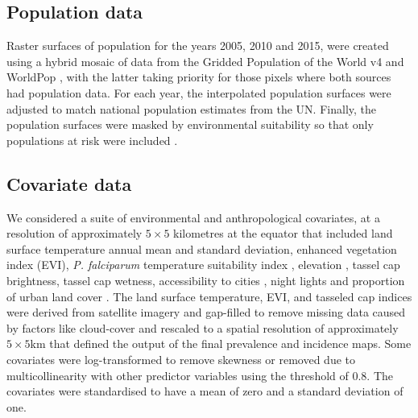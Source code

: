\documentclass{statsoc}
\begin{document}
\subsection*{Population data}

Raster surfaces of population for the years 2005, 2010 and 2015, were created using a hybrid mosaic of data from the Gridded Population of the World v4 \citep{gpw4} and WorldPop \citep{tatem2017worldpop}, with the latter taking priority for those pixels where both sources had population data.
For each year, the interpolated population surfaces were adjusted to match national population estimates from the UN. 
Finally, the population surfaces were masked by environmental suitability so that only populations at risk were included \citep{weiss2019mapping}.


\subsection*{Covariate data}

We considered a suite of environmental and anthropological covariates, at a resolution of approximately $5 \times 5$ kilometres at the equator that included land surface temperature annual mean and standard deviation, enhanced vegetation index (EVI), \emph{P. falciparum} temperature suitability index \citep{weiss2014air}, elevation \citep{SRTMElev}, tassel cap brightness, tassel cap wetness, accessibility to cities \citep{weiss2018global}, night lights \citep{elvidge2017viirs} and proportion of urban land cover \citep{GUF}. %
The land surface temperature, EVI, and tasseled cap indices were derived from satellite imagery and gap-filled to remove missing data caused by factors like cloud-cover \citep{weiss2014effective} and rescaled to a spatial resolution of approximately $5\times 5$km \citep{weiss2015re} that defined the output of the final prevalence and incidence maps.
Some covariates were log-transformed to remove skewness or removed due to multicollinearity with other predictor variables using the threshold of 0.8. %
The covariates were standardised to have a mean of zero and a standard deviation of one.
\end{document}
